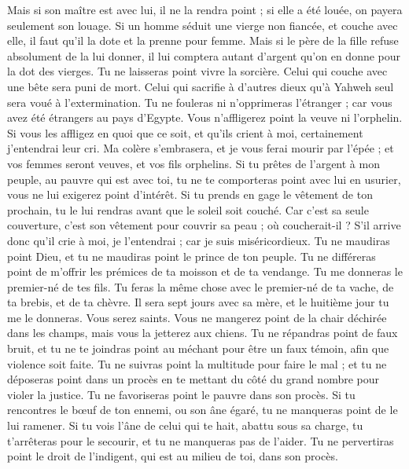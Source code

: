 \begin{multicols}{2}
Mais si son maître est avec lui, il ne la rendra point ; si elle a été louée, on payera seulement son louage.
Si un homme séduit une vierge non fiancée, et couche avec elle, il faut qu'il la dote et la prenne pour femme\FTNT{}.
Mais si le père de la fille refuse absolument de la lui donner, il lui comptera autant d'argent qu'on en donne pour la dot des vierges.
Tu ne laisseras point vivre la sorcière\FTNT{}.
Celui qui couche avec une bête sera puni de mort\FTNT{}.
Celui qui sacrifie à d'autres dieux qu'à Yahweh seul sera voué à l’extermination\FTNT{}.
Tu ne fouleras ni n'opprimeras l'étranger ; car vous avez été étrangers au pays d'Egypte\FTNT{}.
Vous n'affligerez point la veuve ni l'orphelin\FTNT{}.
Si vous les affligez en quoi que ce soit, et qu'ils crient à moi, certainement j'entendrai leur cri.
Ma colère s'embrasera, et je vous ferai mourir par l'épée ; et vos femmes seront veuves, et vos fils orphelins.
Si tu prêtes de l'argent à mon peuple, au pauvre qui est avec toi, tu ne te comporteras point avec lui en usurier, vous ne lui exigerez point d’intérêt.
Si tu prends en gage le vêtement de ton prochain, tu le lui rendras avant que le soleil soit couché\FTNT{}.
Car c'est sa seule couverture, c'est son vêtement pour couvrir sa peau ; où coucherait-il ? S'il arrive donc qu'il crie à moi, je l'entendrai ; car je suis miséricordieux.
Tu ne maudiras point Dieu, et tu ne maudiras point le prince de ton peuple\FTNT{}.
Tu ne différeras point de m'offrir les prémices de ta moisson et de ta vendange. Tu me donneras le premier-né de tes fils\FTNT{}.
Tu feras la même chose avec le premier-né de ta vache, de ta brebis, et de ta chèvre. Il sera sept jours avec sa mère, et le huitième jour tu me le donneras.
Vous serez saints. Vous ne mangerez point de la chair déchirée dans les champs, mais vous la jetterez aux chiens.
\VerseOne{}Tu ne répandras point de faux bruit, et tu ne te joindras point au méchant pour être un faux témoin, afin que violence soit faite\FTNT{}.
Tu ne suivras point la multitude pour faire le mal ; et tu ne déposeras point dans un procès en te mettant du côté du grand nombre pour violer la justice.
Tu ne favoriseras point le pauvre dans son procès\FTNT{}.
Si tu rencontres le bœuf de ton ennemi, ou son âne égaré, tu ne manqueras point de le lui ramener.
Si tu vois l'âne de celui qui te hait, abattu sous sa charge, tu t'arrêteras pour le secourir, et tu ne manqueras pas de l'aider.
Tu ne pervertiras point le droit de l'indigent, qui est au milieu de toi, dans son procès.

\end{multicols}
